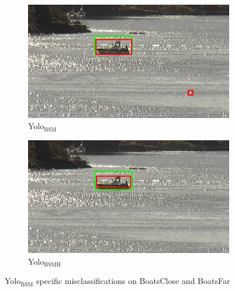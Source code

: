 \begin{figure}[h!]
\begin{subfigure}{.5\textwidth}
  \centering
  \includegraphics[width=0.9\linewidth]{results/case_buildings/yolo23/grove/yolo2/selected_08_11_frame1070.jpg}
  \caption{Yolo$_{\text{BSM}}$}
\end{subfigure}%
\begin{subfigure}{.5\textwidth}
  \centering
  \includegraphics[width=.9\linewidth]{results/case_buildings/yolo23/grove/yolo3/selected_08_11_frame1070.jpg}
  \caption{Yolo$_{\text{BSMH}}$}
\end{subfigure}
\caption{Yolo$_{\text{BSM}}$ specific misclassifications on BoatsClose and BoatsFar}
\label{img:yolo2_misclas}

\end{figure}

\newpage

